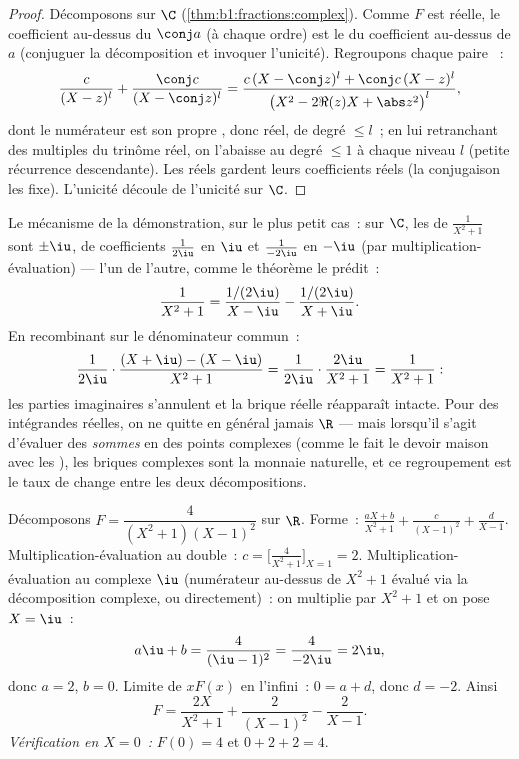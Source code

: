 \begin{proof}
Décomposons sur $\C$ (\cref{thm:b1:fractions:complex}). Comme $F$ est
réelle, le coefficient au-dessus du  $\conj a$ (à chaque ordre) est
le  du coefficient au-dessus de $a$ (conjuguer la décomposition
et invoquer l'unicité). Regroupons chaque paire ~:
\[
\frac{c}{(X - z)^l} + \frac{\conj c}{(X - \conj z)^l}
= \frac{c\,(X - \conj z)^l + \conj c\,(X - z)^l}{\bigl(X^2 - 2\Re(z)X
+ \abs z^2\bigr)^{l}},
\]
dont le numérateur est son propre , donc réel, de degré $\leq
l$~; en lui retranchant des multiples du trinôme réel, on l'abaisse au
degré $\leq 1$ à chaque niveau $l$ (petite récurrence descendante). Les
 réels gardent leurs coefficients réels (la conjugaison les fixe).
L'unicité découle de l'unicité sur $\C$.
\end{proof}

\begin{example}\label{ex:b1:fractions:pairing}
Le mécanisme de la démonstration, sur le plus petit cas~: sur $\C$, les
 de $\frac1{X^2+1}$ sont $\pm\iu$, de coefficients
$\frac1{2\iu}$ en $\iu$ et $\frac1{-2\iu}$ en $-\iu$ (par
multiplication-évaluation) ---  l'un de l'autre, comme le
théorème le prédit~:
\[
\frac{1}{X^2 + 1}
= \frac{1/(2\iu)}{X - \iu} - \frac{1/(2\iu)}{X + \iu} .
\]
En recombinant sur le dénominateur commun~:
\[
\frac{1}{2\iu}\cdot\frac{(X + \iu) - (X - \iu)}{X^2 + 1}
= \frac{1}{2\iu}\cdot\frac{2\iu}{X^2 + 1} = \frac{1}{X^2+1} :
\]
les parties imaginaires s'annulent et la brique réelle réapparaît
intacte. Pour des intégrandes réelles, on ne quitte en général jamais
$\R$ --- mais lorsqu'il s'agit d'évaluer des \emph{sommes} en des points
complexes (comme le fait le devoir maison avec les ),
les briques complexes sont la monnaie naturelle, et ce regroupement est
le taux de change entre les deux décompositions.
\end{example}

\begin{example}\label{ex:b1:fractions:real}
Décomposons $F = \dfrac{4}{(X^2+1)(X-1)^2}$ sur $\R$. Forme~:
$\frac{aX + b}{X^2 + 1} + \frac{c}{(X-1)^2} + \frac{d}{X - 1}$.
Multiplication-évaluation au  double~: $c =
\bigl[\frac{4}{X^2+1}\bigr]_{X=1} = 2$. Multiplication-évaluation au
 complexe $\iu$ (numérateur au-dessus de $X^2 + 1$ évalué via la
décomposition complexe, ou directement)~: on multiplie par $X^2 + 1$ et
on pose $X = \iu$~:
\[
a\iu + b = \frac{4}{(\iu - 1)^2} = \frac{4}{-2\iu} = 2\iu ,
\]
donc $a = 2$, $b = 0$. Limite de $xF(x)$ en l'infini~: $0 = a + d$, donc
$d = -2$. Ainsi
\[
F = \frac{2X}{X^2+1} + \frac{2}{(X-1)^2} - \frac{2}{X-1} .
\]
\emph{Vérification en $X = 0$~:} $F(0) = 4$ et $0 + 2 + 2 = 4$.
\end{example}

